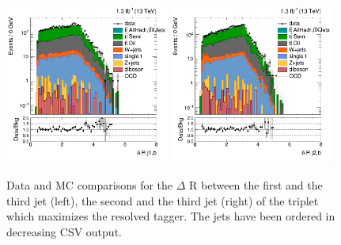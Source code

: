 \begin{figure}[htbp]
	\centering
	\includegraphics[width=0.48\textwidth]{figures/semilep_1tightmuo_resolved_3ormorejets_2ormorejetWPm_pfmetmore100_pfmtmore40_trigrequestonMC_qgsmearedwith8TeVrecipe_Oct302015/hResBDTDRj1b.png}
	\includegraphics[width=0.48\textwidth]{figures/semilep_1tightmuo_resolved_3ormorejets_2ormorejetWPm_pfmetmore100_pfmtmore40_trigrequestonMC_qgsmearedwith8TeVrecipe_Oct302015/hResBDTDRj2b.png}
	\caption{Data and MC comparisons for the $\Delta$ R between the first and the third jet (left), the second and the third jet (right) of the triplet which maximizes the resolved tagger. The jets have been ordered in decreasing CSV output.}
	\label{fig:dRj12b13TeV}
\end{figure}

